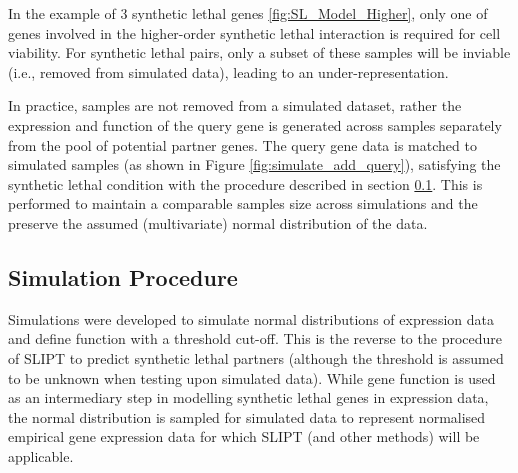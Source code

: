 In the example of 3 synthetic lethal genes \ref{fig:SL_Model_Higher}, only one of genes involved in the higher-order synthetic lethal interaction is required for cell viability. For synthetic lethal pairs, only a subset of these samples will be inviable (i.e., removed from simulated data), leading to an under-representation.

In practice, samples are not removed from a simulated dataset, rather the expression and function of the query gene is generated across samples separately from the pool of potential partner genes. The query gene data is matched to simulated samples (as shown in Figure \ref{fig:simulate_add_query}), satisfying the synthetic lethal condition with the procedure described in section \ref{methods:simulating_SL}. This is performed to maintain a comparable samples size across simulations and the preserve the assumed (multivariate) normal distribution of the data. 

\FloatBarrier

\subsection{Simulation Procedure} \label{methods:simulating_SL}

Simulations were developed to simulate normal distributions of expression data and define function with a threshold cut-off. This is the reverse to the procedure of SLIPT to predict synthetic lethal partners (although the threshold is assumed to be unknown when testing upon simulated data). While gene function is used as an intermediary step in modelling synthetic lethal genes in expression data, the normal distribution is sampled for simulated data to represent normalised empirical gene expression data for which SLIPT (and other methods) will be applicable.

